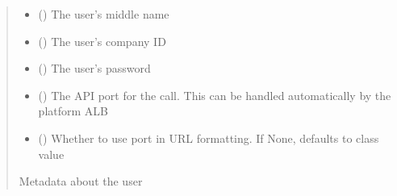 \documentclass[letterpaper,10pt,english]{sphinxmanual}
\begin{document}
\begin{fulllineitems}
\begin{fulllineitems}
\begin{quote}
\begin{description}
\begin{itemize}
\item {} 
\sphinxAtStartPar
{} (\sphinxstyleliteralemphasis{\sphinxupquote{ (}}\sphinxstyleliteralemphasis{\sphinxupquote{)}}) \textendash{} The user’s middle name

\item {} 
\sphinxAtStartPar
{} (\sphinxstyleliteralemphasis{\sphinxupquote{ (}}\sphinxstyleliteralemphasis{\sphinxupquote{)}}) \textendash{} The user’s company ID

\item {} 
\sphinxAtStartPar
{} (\sphinxstyleliteralemphasis{\sphinxupquote{ (}}\sphinxstyleliteralemphasis{\sphinxupquote{)}}) \textendash{} The user’s password

\item {} 
\sphinxAtStartPar
{} (\sphinxstyleliteralemphasis{\sphinxupquote{ (}}\sphinxstyleliteralemphasis{\sphinxupquote{)}}) \textendash{} The API port for the call. This can be handled automatically by the platform ALB

\item {} 
\sphinxAtStartPar
{} (\sphinxstyleliteralemphasis{\sphinxupquote{ (}}\sphinxstyleliteralemphasis{\sphinxupquote{)}}) \textendash{} Whether to use port in URL formatting. If None, defaults to class value

\end{itemize}

\sphinxAtStartPar
{} \textendash{} Metadata about the user


\end{description}
\end{quote}
\end{fulllineitems}
\end{fulllineitems}
\end{document}
